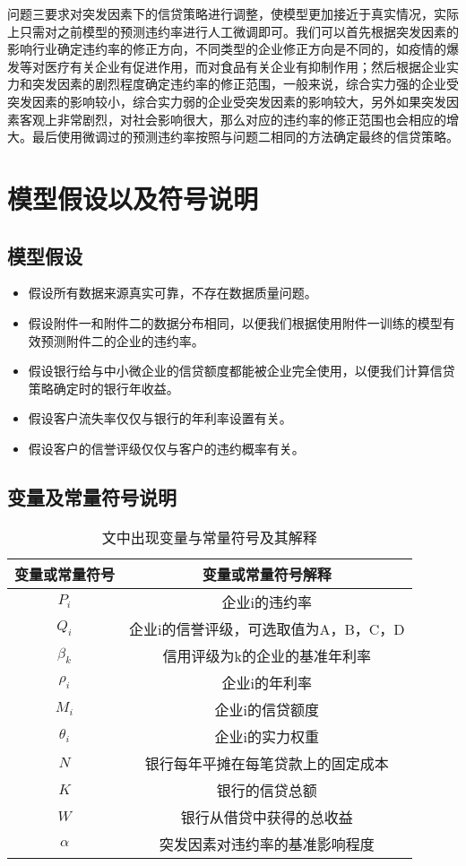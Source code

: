 \documentclass{cumcmthesis}
\begin{document}
问题三要求对突发因素下的信贷策略进行调整，使模型更加接近于真实情况，实际上只需对之前模型的预测违约率进行人工微调即可。我们可以首先根据突发因素的影响行业确定违约率的修正方向，不同类型的企业修正方向是不同的，如疫情的爆发等对医疗有关企业有促进作用，而对食品有关企业有抑制作用；然后根据企业实力和突发因素的剧烈程度确定违约率的修正范围，一般来说，综合实力强的企业受突发因素的影响较小，综合实力弱的企业受突发因素的影响较大，另外如果突发因素客观上非常剧烈，对社会影响很大，那么对应的违约率的修正范围也会相应的增大。最后使用微调过的预测违约率按照与问题二相同的方法确定最终的信贷策略。


\section{模型假设以及符号说明}
\subsection{模型假设}
\begin{itemize}
    \item 假设所有数据来源真实可靠，不存在数据质量问题。
    \item 假设附件一和附件二的数据分布相同，以便我们根据使用附件一训练的模型有效预测附件二的企业的违约率。
    \item 假设银行给与中小微企业的信贷额度都能被企业完全使用，以便我们计算信贷策略确定时的银行年收益。
    \item 假设客户流失率仅仅与银行的年利率设置有关。
    \item 假设客户的信誉评级仅仅与客户的违约概率有关。
\end{itemize}
\subsection{变量及常量符号说明}

\begin{table}[H] 
    
    \label{tablesymbol}
    \centering
    \begin{tabular}{c|c}   
    \hline
    变量或常量符号 & 变量或常量符号解释 \\
    \hline 
    $P_i$ & 企业i的违约率 \\
    $Q_i$ & 企业i的信誉评级，可选取值为A，B，C，D \\
    $\beta_k$ & 信用评级为k的企业的基准年利率 \\
    $\rho_i$ & 企业i的年利率    \\
    $M_i$ & 企业i的信贷额度 \\
    $\theta_i$ & 企业i的实力权重 \\
    $N$ & 银行每年平摊在每笔贷款上的固定成本 \\
    $K$ & 银行的信贷总额 \\
    $W$ & 银行从借贷中获得的总收益 \\
    $\alpha$ & 突发因素对违约率的基准影响程度 \\



    \end{tabular}
    \caption{文中出现变量与常量符号及其解释}
    \end{table}
\end{document}
